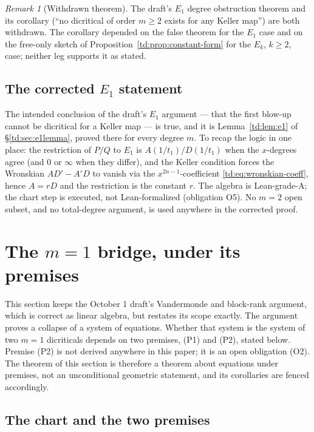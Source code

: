 \documentclass[a4paper,11pt]{article}
\theoremstyle{plain}
\theoremstyle{definition}
\theoremstyle{remark}
\newtheorem{remark}[theorem]{Remark}
\begin{document}
\begin{remark}[Withdrawn theorem]
The draft's $E_1$ degree obstruction theorem and its corollary (``no dicritical of order
$m \geq 2$ exists for any Keller map'') are both withdrawn. The corollary depended on the false theorem for the $E_1$ case and on the
free-only sketch of Proposition~\ref{td:prop:constant-form} for the $E_k$, $k \geq 2$, case;
neither leg supports it as stated.
\end{remark}

\subsection{The corrected \texorpdfstring{$E_1$}{E1} statement}

The intended conclusion of the draft's $E_1$ argument --- that the first blow-up cannot be
dicritical for a Keller map --- is true, and it is Lemma~\ref{td:lem:e1} of
\S\ref{td:sec:e1lemma}, proved there for every degree $m$. To recap the logic in one place: the
restriction of $P/Q$ to $E_1$ is $A(1/t_1)/D(1/t_1)$ when the $x$-degrees agree (and $0$ or
$\infty$ when they differ), and the Keller condition forces the Wronskian $AD' - A'D$ to
vanish via the $x^{2n-1}$-coefficient \eqref{td:eq:wronskian-coeff}, hence $A = rD$ and the
restriction is the constant $r$. The algebra is Lean-grade-A; the chart step is executed, not
Lean-formalized (obligation O5). No $m = 2$ open subset, and no total-degree argument, is
used anywhere in the corrected proof.

\section{The \texorpdfstring{$m=1$}{m=1} bridge, under its premises}\label{td:sec:bridge}

This section keeps the October 1 draft's Vandermonde and block-rank argument, which is correct
as linear algebra, but restates its scope exactly. The argument proves a collapse of a system
of equations. Whether that system is the system of two $m = 1$ dicriticals depends on two
premises, (P1) and (P2), stated below. Premise (P2) is not derived anywhere in this paper; it
is an open obligation (O2). The theorem of this section is therefore a theorem about equations
under premises, not an unconditional geometric statement, and its corollaries are fenced
accordingly.

\subsection{The chart and the two premises}
\end{document}
